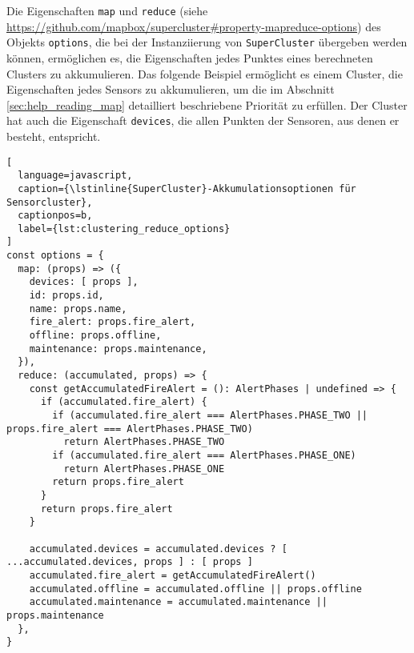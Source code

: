 Die Eigenschaften \lstinline{map} und \lstinline{reduce} (siehe \href{https://github.com/mapbox/supercluster\#property-mapreduce-options}{https://github.com/mapbox/supercluster\#property-mapreduce-options}) des Objekts \lstinline{options}, die bei der Instanziierung von \lstinline{SuperCluster} übergeben werden können, ermöglichen es, die Eigenschaften jedes Punktes eines berechneten Clusters zu akkumulieren.
Das folgende Beispiel ermöglicht es einem Cluster, die Eigenschaften jedes Sensors zu akkumulieren, um die im Abschnitt \ref{sec:help_reading_map} detailliert beschriebene Priorität zu erfüllen.
Der Cluster hat auch die Eigenschaft \lstinline{devices}, die allen Punkten der Sensoren, aus denen er besteht, entspricht.

\begin{lstlisting}[
  language=javascript,
  caption={\lstinline{SuperCluster}-Akkumulationsoptionen für Sensorcluster},
  captionpos=b,
  label={lst:clustering_reduce_options}
]
const options = {
  map: (props) => ({
    devices: [ props ],
    id: props.id,
    name: props.name,
    fire_alert: props.fire_alert,
    offline: props.offline,
    maintenance: props.maintenance,
  }),
  reduce: (accumulated, props) => {
    const getAccumulatedFireAlert = (): AlertPhases | undefined => {
      if (accumulated.fire_alert) {
        if (accumulated.fire_alert === AlertPhases.PHASE_TWO || props.fire_alert === AlertPhases.PHASE_TWO)
          return AlertPhases.PHASE_TWO
        if (accumulated.fire_alert === AlertPhases.PHASE_ONE)
          return AlertPhases.PHASE_ONE
        return props.fire_alert
      }
      return props.fire_alert
    }

    accumulated.devices = accumulated.devices ? [ ...accumulated.devices, props ] : [ props ]
    accumulated.fire_alert = getAccumulatedFireAlert()
    accumulated.offline = accumulated.offline || props.offline
    accumulated.maintenance = accumulated.maintenance || props.maintenance
  },
}
\end{lstlisting}

